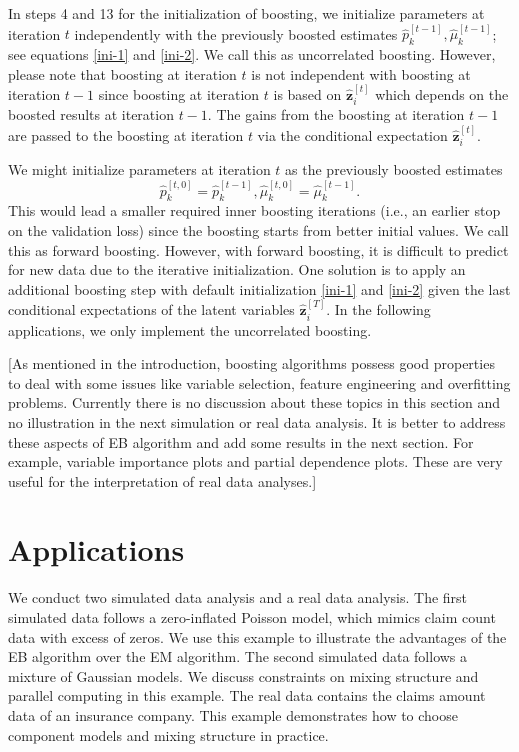 \documentclass[11pt]{article}
\numberwithin{equation}{section}
\def\bz{\boldsymbol{z}}
\begin{document}
In steps 4 and 13 for the initialization of boosting, 
we initialize parameters at iteration $t$ {independently} with the previously boosted estimates $\hat{p}_k^{[t-1]}, \hat{\mu}_k^{[t-1]}$; 
	see equations \eqref{ini-1} and \eqref{ini-2}. 
	We call this as uncorrelated boosting.
	However, please note that boosting at iteration $t$ is not independent with boosting at iteration $t-1$ 
since boosting at iteration $t$ is based on $\hat{\bz}_i^{[t]}$ which depends on the boosted results at iteration $t-1$. 
The gains from the boosting at iteration $t-1$ are passed to  the boosting at iteration $t$ via the conditional expectation $\hat{\bz}_i^{[t]}$. 
	
	We might initialize parameters at iteration $t$ as the previously boosted estimates $$\hat{p}_k^{[t,0]}=\hat{p}_k^{[t-1]}, \hat{\mu}_k^{[t,0]}=\hat{\mu}_k^{[t-1]}.$$
This would lead a {smaller} required inner boosting iterations (i.e., an {earlier} stop on the validation loss) since the boosting starts from better initial values.
	We call this as forward boosting. 
	However, with forward boosting, it is difficult to predict for new data due to the {iterative initialization}. 
	One solution is to apply an additional boosting step with default initialization \eqref{ini-1} and \eqref{ini-2} given the {last conditional expectations of the latent variables $\hat{\bz}^{[T]}_i$}. 
	In the following applications, we only implement the uncorrelated boosting.

{\color{blue}[As mentioned in the introduction, boosting algorithms possess good properties to deal with some issues like variable selection, feature engineering and overfitting problems. Currently there is no discussion about these topics in this section and no illustration in the next simulation or real data analysis. It is better to address these aspects of EB algorithm and add some results in the next section. For example, variable importance plots and partial dependence plots. These are very useful for the interpretation of real data analyses.]}

	
\section{Applications}\label{sec:application}

We conduct two simulated data analysis and a real data analysis. 
The first simulated data follows a zero-inflated Poisson model, which mimics claim count data with excess of zeros.
We use this example to illustrate the advantages of the EB algorithm over the EM algorithm.
The second simulated data follows a mixture of Gaussian models. 
We discuss constraints on mixing structure and parallel computing in this example.
The real data contains the claims amount data of an insurance company. 
This example demonstrates how to choose component models and mixing structure in practice.
\end{document}
